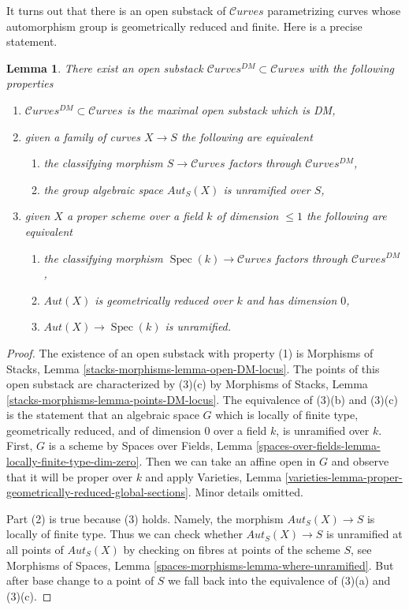\documentclass{stacks-project}
\theoremstyle{plain}
\newtheorem{lemma}[subsection]{Lemma}
\theoremstyle{definition}
\theoremstyle{remark}
\numberwithin{equation}{subsection}
\def\Spec{\mathop{\mathrm{Spec}}}
\def\Curvesstack{\mathcal{C}\!\mathit{urves}}
\begin{document}
\noindent
It turns out that there is an open substack of
$\Curvesstack$ parametrizing curves whose automorphism
group is geometrically reduced and finite.
Here is a precise statement.

\begin{lemma}
\label{lemma-DM-curves}
There exist an open substack $\Curvesstack^{DM} \subset \Curvesstack$
with the following properties
\begin{enumerate}
\item $\Curvesstack^{DM} \subset \Curvesstack$ is the maximal
open substack which is DM,
\item given a family of curves $X \to S$ the following are equivalent
\begin{enumerate}
\item the classifying morphism $S \to \Curvesstack$ factors through
$\Curvesstack^{DM}$,
\item the group algebraic space $\mathit{Aut}_S(X)$ is unramified over $S$,
\end{enumerate}
\item given $X$ a proper scheme over a field $k$ of dimension $\leq 1$
the following are equivalent
\begin{enumerate}
\item the classifying morphism $\Spec(k) \to \Curvesstack$ factors
through $\Curvesstack^{DM}$,
\item $\mathit{Aut}(X)$ is geometrically reduced over $k$ and
has dimension $0$,
\item $\mathit{Aut}(X) \to \Spec(k)$ is unramified.
\end{enumerate}
\end{enumerate}
\end{lemma}

\begin{proof}
The existence of an open substack with property (1) is
Morphisms of Stacks, Lemma \ref{stacks-morphisms-lemma-open-DM-locus}.
The points of this open substack are characterized by (3)(c) by
Morphisms of Stacks, Lemma \ref{stacks-morphisms-lemma-points-DM-locus}.
The equivalence of (3)(b) and (3)(c) is the statement that an
algebraic space $G$ which is locally of finite type, geometrically reduced,
and of dimension $0$ over a field $k$, is unramified over $k$.
First, $G$ is a scheme by Spaces over Fields, Lemma
\ref{spaces-over-fields-lemma-locally-finite-type-dim-zero}.
Then we can take an affine open in $G$ and observe
that it will be proper over $k$ and apply
Varieties, Lemma
\ref{varieties-lemma-proper-geometrically-reduced-global-sections}.
Minor details omitted.

\medskip\noindent
Part (2) is true because (3) holds. Namely, the morphism
$\mathit{Aut}_S(X) \to S$ is locally of finite type. Thus we can check whether
$\mathit{Aut}_S(X) \to S$ is unramified at all points of
$\mathit{Aut}_S(X)$ by checking on fibres at points of the scheme $S$, see
Morphisms of Spaces, Lemma \ref{spaces-morphisms-lemma-where-unramified}.
But after base change to a point of $S$ we fall back into
the equivalence of (3)(a) and (3)(c).
\end{proof}
\end{document}

